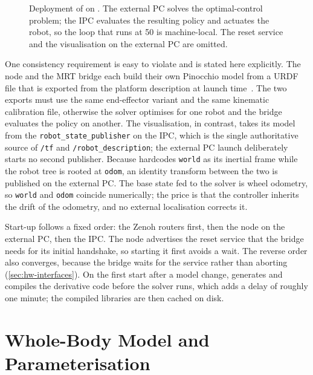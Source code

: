 \begin{figure}[htbp]
  \caption[Deployment of \ocs{} on \hero{}]{%
    Deployment of \ocs{} on \hero{}. The external PC solves the
    optimal-control problem; the IPC evaluates the resulting policy and
    actuates the robot, so the loop that runs at \qty{50}{\hz} is
    machine-local. The reset service and the visualisation on the
    external PC are omitted.}
  \label{fig:architecture}
\end{figure}

One consistency requirement is easy to violate and is stated here
explicitly. The \mpc{} node and the MRT bridge each build their own
Pinocchio model from a URDF file that is exported from the platform
description at launch time~\cite{Carpentier2019Pinocchio}. The two
exports must use the same end-effector variant and the same kinematic
calibration file, otherwise the solver optimises for one robot and the
bridge evaluates the policy on another. The visualisation, in contrast, takes its model from the
\texttt{robot\_state\_publisher} on the IPC, which is the single
authoritative source of \texttt{/tf} and \texttt{/robot\_description};
the external PC launch deliberately starts no second publisher. Because
\ocs{} hardcodes \texttt{world} as its inertial frame while the robot
tree is rooted at \texttt{odom}, an identity transform between the two
is published on the external PC. The base state fed to the solver is
wheel odometry, so \texttt{world} and \texttt{odom} coincide
numerically; the price is that the controller inherits the drift of the
odometry, and no external localisation corrects it.

Start-up follows a fixed order: the Zenoh routers first, then the
\mpc{} node on the external PC, then the IPC. The \mpc{} node advertises
the reset service that the bridge needs for its initial handshake, so
starting it first avoids a wait. The reverse order also converges,
because the bridge waits for the service rather than aborting
(\cref{sec:hw-interfaces}). On the first start after a model change,
\ocs{} generates and compiles the derivative code before the solver
runs, which adds a delay of roughly one minute; the compiled libraries
are then cached on disk.

\section{Whole-Body Model and Parameterisation}
\label{sec:wholebody-model}

